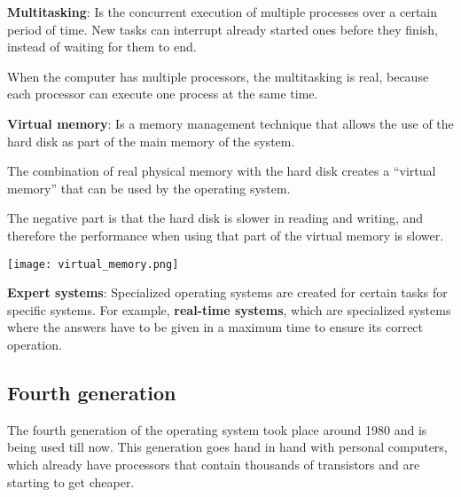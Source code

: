 \begin{itemize}
    \item \textbf{Multitasking}: Is the concurrent execution of multiple processes over a certain period of time. New tasks can interrupt already started ones before they finish, instead of waiting for them to end.

    When the computer has multiple processors, the multitasking is real, because each processor can execute one process at the same time.

    \begin{minipage}{0.6\linewidth}
        \item \textbf{Virtual memory}: Is a memory management technique that allows the use of the hard disk as part of the main memory of the system.

        The combination of real physical memory with the hard disk creates a “virtual memory” that can be used by the operating system.

        The negative part is that the hard disk is slower in reading and writing, and therefore the performance when using that part of the virtual memory is slower.
    \end{minipage}
    \hfill
    \begin{minipage}{0.3\linewidth}
        \texttt{[image: virtual\_memory.png]}
        \vspace{-10pt}
    \end{minipage}

    \vspace{10pt}
    \item \textbf{Expert systems}: Specialized operating systems are created for certain tasks for specific systems. For example, \textbf{real-time systems}, which are specialized systems where the answers have to be given in a maximum time to ensure its correct operation.
\end{itemize}

\subsection{Fourth generation}
The fourth generation of the operating system took place around 1980 and is being used till now. This generation goes hand in hand with personal computers, which already have processors that contain thousands of transistors and are starting to get cheaper.

